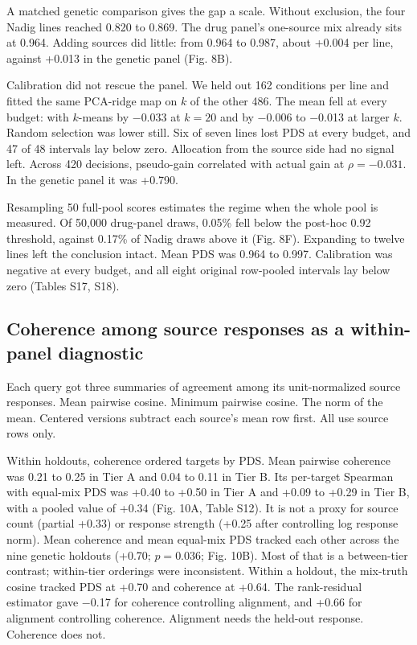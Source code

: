\documentclass[12pt]{article}
\begin{document}
A matched genetic comparison gives the gap a scale. Without exclusion, the four Nadig lines reached 0.820 to 0.869. The drug panel's one-source mix already sits at 0.964. Adding sources did little: from 0.964 to 0.987, about +0.004 per line, against +0.013 in the genetic panel (Fig. 8B).

Calibration did not rescue the panel. We held out 162 conditions per line and fitted the same PCA-ridge map on $k$ of the other 486. The mean fell at every budget: with $k$-means by $-$0.033 at $k = 20$ and by $-$0.006 to $-$0.013 at larger $k$. Random selection was lower still. Six of seven lines lost PDS at every budget, and 47 of 48 intervals lay below zero. Allocation from the source side had no signal left. Across 420 decisions, pseudo-gain correlated with actual gain at $\rho = -0.031$. In the genetic panel it was +0.790.

Resampling 50 full-pool scores estimates the regime when the whole pool is measured. Of 50,000 drug-panel draws, 0.05\% fell below the post-hoc 0.92 threshold, against 0.17\% of Nadig draws above it (Fig. 8F). Expanding to twelve lines left the conclusion intact. Mean PDS was 0.964 to 0.997. Calibration was negative at every budget, and all eight original row-pooled intervals lay below zero (Tables S17, S18).

\subsection{Coherence among source responses as a within-panel diagnostic}

Each query got three summaries of agreement among its unit-normalized source responses. Mean pairwise cosine. Minimum pairwise cosine. The norm of the mean. Centered versions subtract each source's mean row first. All use source rows only.

Within holdouts, coherence ordered targets by PDS. Mean pairwise coherence was 0.21 to 0.25 in Tier A and 0.04 to 0.11 in Tier B. Its per-target Spearman with equal-mix PDS was +0.40 to +0.50 in Tier A and +0.09 to +0.29 in Tier B, with a pooled value of +0.34 (Fig. 10A, Table S12). It is not a proxy for source count (partial +0.33) or response strength (+0.25 after controlling log response norm). Mean coherence and mean equal-mix PDS tracked each other across the nine genetic holdouts (+0.70; $p = 0.036$; Fig. 10B). Most of that is a between-tier contrast; within-tier orderings were inconsistent. Within a holdout, the mix-truth cosine tracked PDS at +0.70 and coherence at +0.64. The rank-residual estimator gave $-$0.17 for coherence controlling alignment, and +0.66 for alignment controlling coherence. Alignment needs the held-out response. Coherence does not.
\end{document}

